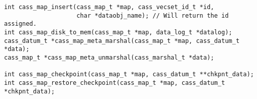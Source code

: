 \begin{verbatim}
int cass_map_insert(cass_map_t *map, cass_vecset_id_t *id,
                    char *dataobj_name); // Will return the id assigned.
int cass_map_disk_to_mem(cass_map_t *map, data_log_t *datalog);
cass_datum_t *cass_map_meta_marshal(cass_map_t *map, cass_datum_t *data);
cass_map_t *cass_map_meta_unmarshal(cass_marshal_t *data);

int cass_map_checkpoint(cass_map_t *map, cass_datum_t **chkpnt_data);
int cass_map_restore_checkpoint(cass_map_t *map, cass_datum_t *chkpnt_data);
\end{verbatim}
